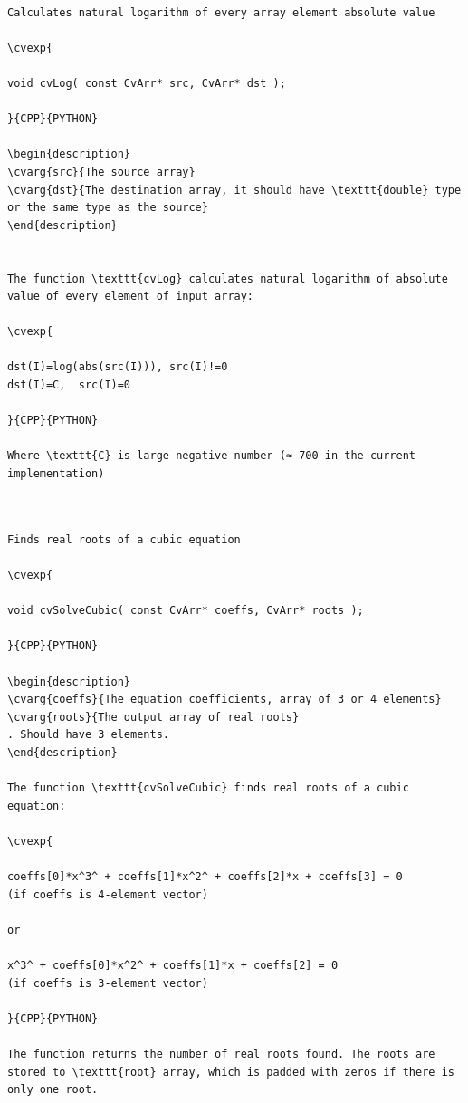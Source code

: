 \label{Log}
\begin{verbatim}

Calculates natural logarithm of every array element absolute value

\cvexp{

void cvLog( const CvArr* src, CvArr* dst );

}{CPP}{PYTHON}

\begin{description}
\cvarg{src}{The source array}
\cvarg{dst}{The destination array, it should have \texttt{double} type or the same type as the source}
\end{description}


The function \texttt{cvLog} calculates natural logarithm of absolute value of every element of input array:

\cvexp{

dst(I)=log(abs(src(I))), src(I)!=0
dst(I)=C,  src(I)=0

}{CPP}{PYTHON}

Where \texttt{C} is large negative number (≈-700 in the current implementation)


\end{verbatim}
\label{SolveCubic}
\begin{verbatim}

Finds real roots of a cubic equation

\cvexp{

void cvSolveCubic( const CvArr* coeffs, CvArr* roots );

}{CPP}{PYTHON}

\begin{description}
\cvarg{coeffs}{The equation coefficients, array of 3 or 4 elements}
\cvarg{roots}{The output array of real roots}
. Should have 3 elements.
\end{description}

The function \texttt{cvSolveCubic} finds real roots of a cubic equation:

\cvexp{

coeffs[0]*x^3^ + coeffs[1]*x^2^ + coeffs[2]*x + coeffs[3] = 0
(if coeffs is 4-element vector)

or

x^3^ + coeffs[0]*x^2^ + coeffs[1]*x + coeffs[2] = 0
(if coeffs is 3-element vector)

}{CPP}{PYTHON}

The function returns the number of real roots found. The roots are stored to \texttt{root} array, which is padded with zeros if there is only one root.


\end{verbatim}
